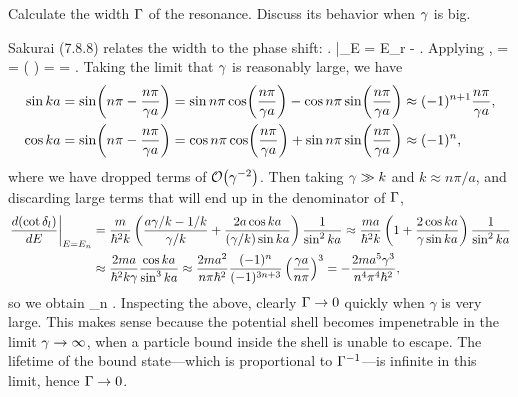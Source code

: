 


\begin{problem}
	Calculate the width $\Gamma$ of the resonance.  Discuss its behavior when $\gamma$ is big.
\end{problem}

\begin{solution}
	Sakurai (7.8.8) relates the width to the phase shift:
	\beq
		\left.  \right|_{E = E_r} \equiv - .
	\eeq
	Applying ,
	\beq
		 =  
		=   \!\left(  \right)
		=  
		=  .
	\eeq
	Taking the limit that $\gamma$ is reasonably large, we have
	\begin{align*}
		\sin ka &= \sin(n\pi - \frac{n\pi}{\gamma a})
		= \sin n\pi \cos(\frac{n\pi}{\gamma a}) - \cos n\pi \sin(\frac{n\pi}{\gamma a})
		\approx (-1)^{n+1} \frac{n\pi}{\gamma a}, \\
		\cos ka &= \sin(n\pi - \frac{n\pi}{\gamma a})
		= \cos n\pi \cos(\frac{n\pi}{\gamma a}) + \sin n\pi \sin(\frac{n\pi}{\gamma a})
		\approx (-1)^n,
	\end{align*}
	where we have dropped terms of $\order{\gam^{-2}}$.  Then taking $\gamma \gg k$ and $k \approx n\pi / a$, and discarding large terms that will end up in the denominator of $\Gamma$,
	\begin{align*}
		\left. \dv{(\cot\delta_l)}{E} \right|_{E = E_n} &= \frac{m}{\hbar^2 k} \left( \frac{a\gamma/k - 1/k}{\gamma/k} + \frac{2 a \cos ka}{(\gamma/k) \sin ka} \right) \frac{1}{\sin^2 ka}
		\approx \frac{m a}{\hbar^2 k} \left( 1 + \frac{2 \cos ka}{\gamma \sin ka} \right) \frac{1}{\sin^2 ka} \\
		&\approx \frac{2 m a}{\hbar^2 k \gamma} \frac{\cos ka}{\sin^3 ka}
		\approx \frac{2 m a^2}{n\pi \hbar^2} \frac{(-1)^n}{(-1)^{3n+3}} \left( \frac{\gamma a}{n\pi} \right)^3
		= -\frac{2 m a^5 \gamma^3}{n^4 \pi^4 \hbar^2},
	\end{align*}
	so we obtain
	\beq
		\Gam_n \approx {}.
	\eeq
	Inspecting the above, clearly $\Gamma \to 0$ quickly when $\gamma$ is very large.  This makes sense because the potential shell becomes impenetrable in the limit $\gamma \to \infty$, when a particle bound inside the shell is unable to escape.  The lifetime of the bound state---which is proportional to $\Gamma^{-1}$---is infinite in this limit, hence $\Gamma \to 0$.
\end{solution}



